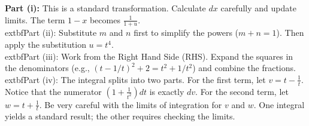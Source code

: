\begin{hint}
\textbf{Part (i):} This is a standard transformation. Calculate $dx$ carefully and update limits. The term $1-x$ becomes $\frac{1}{1+u}$.\\
	extbf{Part (ii):} Substitute $m$ and $n$ first to simplify the powers ($m+n=1$). Then apply the substitution $u=t^4$.\\
	extbf{Part (iii):} Work from the Right Hand Side (RHS). Expand the squares in the denominators (e.g., $(t-1/t)^2 + 2 = t^2 + 1/t^2$) and combine the fractions.\\
	extbf{Part (iv):} The integral splits into two parts. For the first term, let $v = t - \frac{1}{t}$. Notice that the numerator $(1+\frac{1}{t^2})dt$ is exactly $dv$. For the second term, let $w = t + \frac{1}{t}$. Be very careful with the limits of integration for $v$ and $w$. One integral yields a standard result; the other requires checking the limits.
\end{hint}

